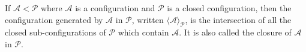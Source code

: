 If $\mathcal{A} < \mathcal{P}$ where $\mathcal{A}$ is a configuration and $\mathcal{P}$ is a closed configuration, then the configuration generated by $\mathcal{A}$ in $\mathcal{P}$, written $\langle \mathcal{A} \rangle_{\mathcal{P}}$, is the intersection of all the closed sub-configurations of $\mathcal{P}$ which contain $\mathcal{A}$. It is also called the closure of $\mathcal{A}$ in $\mathcal{P}$.
